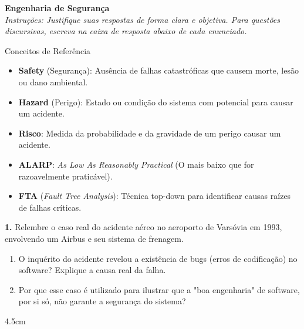 \documentclass[12pt]{article}
\begin{document}

\vspace*{0.2cm}

\begin{center}
  {\Large \textbf{Engenharia de Segurança}}\\[0.2cm]
  \textit{Instruções: Justifique suas respostas de forma clara e objetiva.
  Para questões discursivas, escreva na caixa de resposta abaixo de cada enunciado.}
\end{center}

\vspace{0.4cm}

\begin{block}{Conceitos de Referência}
  \small
  \begin{itemize}
    \item \textbf{Safety} (Segurança): Ausência de falhas catastróficas que causem morte, lesão ou dano ambiental.
    \item \textbf{Hazard} (Perigo): Estado ou condição do sistema com potencial para causar um acidente.
    \item \textbf{Risco}: Medida da probabilidade e da gravidade de um perigo causar um acidente.
    \item \textbf{ALARP}: \textit{As Low As Reasonably Practical} (O mais baixo que for razoavelmente praticável).
    \item \textbf{FTA} (\textit{Fault Tree Analysis}): Técnica top-down para identificar causas raízes de falhas críticas.
  \end{itemize}
\end{block}

\vspace{0.5cm}

\textbf{1.} Relembre o caso real do acidente aéreo no aeroporto de Varsóvia em 1993, envolvendo um Airbus e seu sistema de frenagem.

\begin{enumerate}[label=\alph*)]
  \item O inquérito do acidente revelou a existência de bugs (erros de codificação) no software? Explique a causa real da falha.
  \item Por que esse caso é utilizado para ilustrar que a "boa engenharia" de software, por si só, não garante a segurança do sistema?
\end{enumerate}
\begin{resposta}{4.5cm}
\end{resposta}
\end{document}
